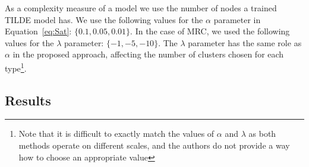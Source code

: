 As a complexity measure of a model we use the number of nodes a trained TILDE model has.
We use the following values for the $\alpha$ parameter in Equation~\ref{eq:Sat}: $\{ 0.1,0.05, 0.01 \}$.
In the case of MRC, we used the following values for the $\lambda$ parameter: $\{-1,-5,-10\}$.
The $\lambda$ parameter has the same role as $\alpha$ in the proposed approach, affecting the number of clusters chosen for each type\footnote{Note that it is difficult to exactly match the values of $\alpha$ and $\lambda$ as both methods operate on different scales, and the authors do not provide a way how to choose an appropriate value}. 




\subsection*{Results}


